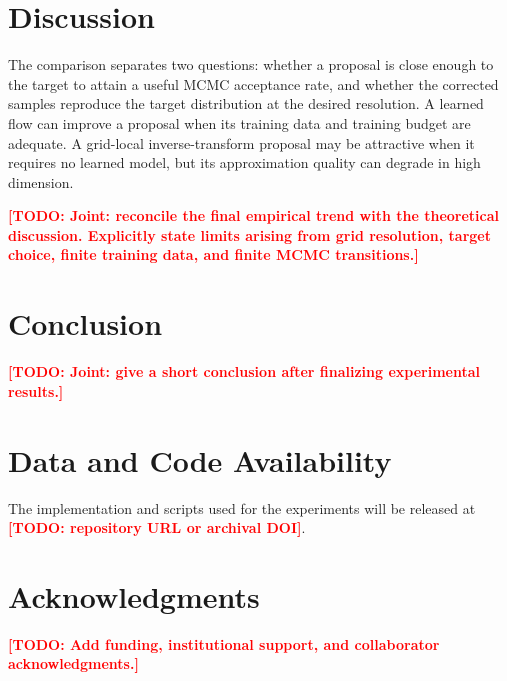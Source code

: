 \documentclass[11pt]{article}
\newcommand{\todo}[1]{\textcolor{red}{\textbf{[TODO: #1]}}}
\begin{document}
\section{Discussion}
\label{sec:discussion}
The comparison separates two questions: whether a proposal is close enough to the target to attain a useful MCMC acceptance rate, and whether the corrected samples reproduce the target distribution at the desired resolution. A learned flow can improve a proposal when its training data and training budget are adequate. A grid-local inverse-transform proposal may be attractive when it requires no learned model, but its approximation quality can degrade in high dimension.

\todo{Joint: reconcile the final empirical trend with the theoretical discussion. Explicitly state limits arising from grid resolution, target choice, finite training data, and finite MCMC transitions.}

\section{Conclusion}
\todo{Joint: give a short conclusion after finalizing experimental results.}

\section*{Data and Code Availability}
The implementation and scripts used for the experiments will be released at \todo{repository URL or archival DOI}.

\section*{Acknowledgments}
\todo{Add funding, institutional support, and collaborator acknowledgments.}



\end{document}
